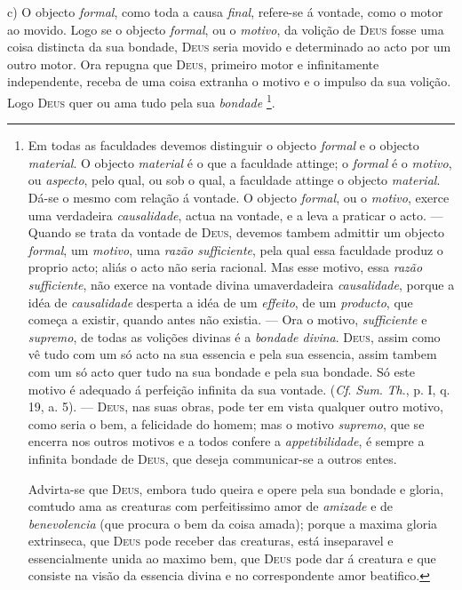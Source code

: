 c) O objecto \emph{formal}, como toda a causa \emph{final}, refere-se á vontade, como o motor ao movido. Logo se o objecto \emph{formal}, ou o \emph{motivo}, da volição de \textsc{Deus} fosse uma coisa distincta da sua bondade, \textsc{Deus} seria movido e determinado ao acto por um outro motor. Ora repugna que \textsc{Deus}, primeiro motor e infinitamente independente, receba de uma coisa extranha o motivo e o impulso da sua volição. Logo \textsc{Deus} quer ou ama tudo pela sua \emph{bondade} \footnote{Em todas as faculdades devemos distinguir o objecto \emph{formal} e o objecto \emph{material}. O objecto \emph{material} é o que a faculdade attinge; o \emph{formal} é o \emph{motivo}, ou \emph{aspecto}, pelo qual, ou sob o qual, a faculdade attinge o objecto \emph{material}. Dá-se o mesmo com relação á vontade. O objecto \emph{formal}, ou o \emph{motivo}, exerce uma verdadeira \emph{causalidade}, actua na vontade, e a leva a praticar o acto. --- Quando se trata da vontade de \textsc{Deus}, devemos tambem admittir um objecto \emph{formal}, um \emph{motivo}, uma \emph{razão sufficiente}, pela qual essa faculdade produz o proprio acto; aliás o acto não seria racional. Mas esse motivo, essa \emph{razão sufficiente}, não exerce na vontade divina umaverdadeira \emph{causalidade}, porque a idéa de \emph{causalidade} desperta a idéa de um \emph{effeito}, de um \emph{producto}, que começa a existir, quando antes não existia. --- Ora o motivo, \emph{sufficiente} e \emph{supremo}, de todas as volições divinas é a \emph{bondade divina}. \textsc{Deus}, assim como vê tudo com um só acto na sua essencia e pela sua essencia, assim tambem com um só acto quer tudo na sua bondade e pela sua bondade. Só este motivo é adequado á perfeição infinita da sua vontade. (\emph{Cf}. \emph{Sum}. \emph{Th}., p. I, q. 19, a. 5). --- \textsc{Deus}, nas suas obras, pode ter em vista qualquer outro motivo, como seria o bem, a felicidade do homem; mas o motivo \emph{supremo}, que se encerra nos outros motivos e a todos confere a \emph{appetibilidade}, é sempre a infinita bondade de \textsc{Deus}, que deseja communicar-se a outros entes.\par Advirta-se que \textsc{Deus}, embora tudo queira e opere pela sua bondade e gloria, comtudo ama as creaturas com perfeitissimo amor de \emph{amizade} e de \emph{benevolencia} (que procura o bem da coisa amada); porque a maxima gloria extrinseca, que \textsc{Deus} pode receber das creaturas, está inseparavel e essencialmente unida ao maximo bem, que \textsc{Deus} pode dar á creatura e que consiste na visão da essencia divina e no correspondente amor beatifico.}.

